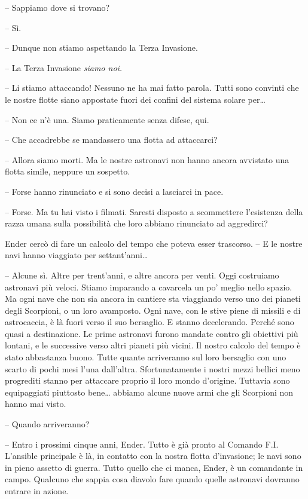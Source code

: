 {-- Sappiamo dove si trovano?}

{-- Sì.}

{-- Dunque non stiamo aspettando la Terza Invasione.}

{-- La Terza Invasione \emph{siamo noi.}}

{-- Li stiamo attaccando! Nessuno ne ha mai fatto parola. Tutti sono
	convinti che le nostre flotte siano appostate fuori dei confini del
	sistema solare per\ldots{}}

{-- Non ce n'è una. Siamo praticamente senza difese, qui.}

{-- Che accadrebbe se mandassero una flotta ad attaccarci?}

{-- Allora siamo morti. Ma le nostre astronavi non hanno ancora
	avvistato una flotta simile, neppure un sospetto.}

{-- Forse hanno rinunciato e si sono decisi a lasciarci in pace.}

{-- Forse. Ma tu hai visto i filmati. Saresti disposto a scommettere
	l'esistenza della razza umana sulla possibilità che loro abbiano
	rinunciato ad aggredirci?}

{Ender cercò di fare un calcolo del tempo che poteva esser trascorso. --
	E le nostre navi hanno viaggiato per settant'anni\ldots{}}

{-- Alcune sì. Altre per trent'anni, e altre ancora per venti. Oggi
	costruiamo astronavi più veloci. Stiamo imparando a cavarcela un po'
	meglio nello spazio. Ma ogni nave che non sia ancora in cantiere sta
	viaggiando verso uno dei pianeti degli Scorpioni, o un loro avamposto.
	Ogni nave, con le stive piene di missili e di astrocaccia, è là fuori
	verso il suo bersaglio. E stanno decelerando. Perché sono quasi a
	destinazione. Le prime astronavi furono mandate contro gli obiettivi più
	lontani, e le successive verso altri pianeti più vicini. Il nostro
	calcolo del tempo è stato abbastanza buono. Tutte quante arriveranno sul
	loro bersaglio con uno scarto di pochi mesi l'una dall'altra.
	Sfortunatamente i nostri mezzi bellici meno progrediti stanno per
	attaccare proprio il loro mondo d'origine. Tuttavia sono equipaggiati
	piuttosto bene\ldots{} abbiamo alcune nuove armi che gli Scorpioni non
	hanno mai visto.}

{-- Quando arriveranno?}

{-- Entro i prossimi cinque anni, Ender. Tutto è già pronto al Comando
	F.I. L'ansible principale è là, in contatto con la nostra flotta
	d'invasione; le navi sono in pieno assetto di guerra. Tutto quello che
	ci manca, Ender, è un comandante in campo. Qualcuno che sappia cosa
	diavolo fare quando quelle astronavi dovranno entrare in azione.}

